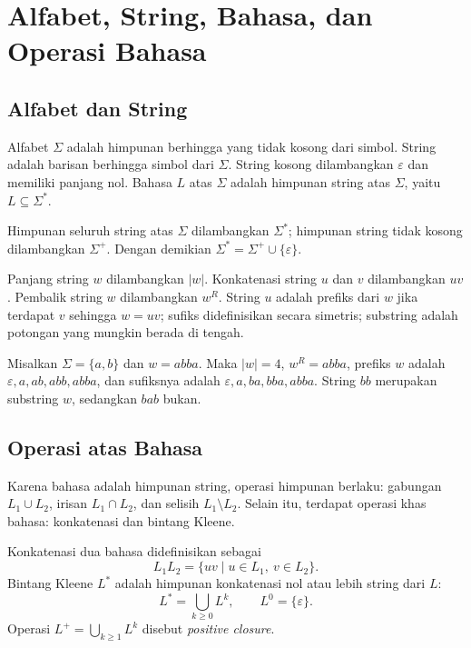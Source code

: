 \section{Alfabet, String, Bahasa, dan Operasi Bahasa}
\label{sec:ch02-bahasa}

\subsection{Alfabet dan String}

\begin{definisi}
Alfabet \(\Sigma\) adalah himpunan berhingga yang tidak kosong dari
simbol. String adalah barisan berhingga simbol dari \(\Sigma\). String
kosong dilambangkan \(\varepsilon\) dan memiliki panjang nol. Bahasa
\(L\) atas \(\Sigma\) adalah himpunan string atas \(\Sigma\), yaitu
\(L \subseteq \Sigma^{*}\).
\end{definisi}

Himpunan seluruh string atas \(\Sigma\) dilambangkan \(\Sigma^{*}\);
himpunan string tidak kosong dilambangkan \(\Sigma^{+}\). Dengan
demikian \(\Sigma^{*} = \Sigma^{+} \cup \{\varepsilon\}\).

Panjang string \(w\) dilambangkan \(|w|\). Konkatenasi string \(u\)
dan \(v\) dilambangkan \(uv\). Pembalik string \(w\) dilambangkan
\(w^{R}\). String \(u\) adalah prefiks dari \(w\) jika terdapat \(v\)
sehingga \(w = uv\); sufiks didefinisikan secara simetris; substring
adalah potongan yang mungkin berada di tengah.

\begin{contoh}
Misalkan \(\Sigma = \{a,b\}\) dan \(w = abba\). Maka \(|w| = 4\),
\(w^{R} = abba\), prefiks \(w\) adalah
\(\varepsilon, a, ab, abb, abba\), dan sufiksnya adalah
\(\varepsilon, a, ba, bba, abba\). String \(bb\) merupakan substring
\(w\), sedangkan \(bab\) bukan.
\end{contoh}

\subsection{Operasi atas Bahasa}

Karena bahasa adalah himpunan string, operasi himpunan berlaku:
gabungan \(L_1 \cup L_2\), irisan \(L_1 \cap L_2\), dan selisih
\(L_1 \setminus L_2\). Selain itu, terdapat operasi khas bahasa:
konkatenasi dan bintang Kleene.

\begin{definisi}
Konkatenasi dua bahasa didefinisikan sebagai
\[
L_1 L_2 = \{uv \mid u \in L_1,\ v \in L_2\}.
\]
Bintang Kleene \(L^{*}\) adalah himpunan konkatenasi nol atau lebih
string dari \(L\):
\[
L^{*} = \bigcup_{k \ge 0} L^{k},
\qquad L^{0} = \{\varepsilon\}.
\]
Operasi \(L^{+} = \bigcup_{k \ge 1} L^{k}\) disebut \emph{positive
closure}.
\end{definisi}


